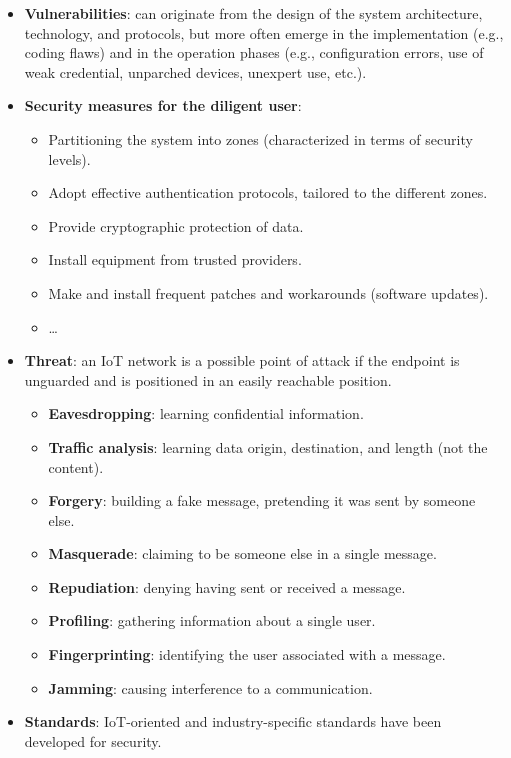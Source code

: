 \begin{itemize}
    \item \textbf{Vulnerabilities}: can originate from the design of the system architecture, technology, and protocols, but more often emerge in the implementation (e.g., coding flaws) and in the operation phases (e.g., configuration errors, use of weak credential, unparched devices, unexpert use, etc.).
    
    \item \textbf{Security measures for the diligent user}:
    \begin{itemize}
        \item Partitioning the system into zones (characterized in terms of security levels).
        \item Adopt effective authentication protocols, tailored to the different zones.
        \item Provide cryptographic protection of data.
        \item Install equipment from trusted providers.
        \item Make and install frequent patches and workarounds (software updates).
        \item \ldots
    \end{itemize}
    
    \item \textbf{Threat}: an IoT network is a possible point of attack if the endpoint is unguarded and is positioned in an easily reachable position.
    \begin{itemize}
        \item \textbf{Eavesdropping}: learning confidential information.
        \item \textbf{Traffic analysis}: learning data origin, destination, and length (not the content).
        \item \textbf{Forgery}: building a fake message, pretending it was sent by someone else.
        \item \textbf{Masquerade}: claiming to be someone else in a single message.
        \item \textbf{Repudiation}: denying having sent or received a message.
        \item \textbf{Profiling}: gathering information about a single user.
        \item \textbf{Fingerprinting}: identifying the user associated with a message.
        \item \textbf{Jamming}: causing interference to a communication.
    \end{itemize}
    
    \item \textbf{Standards}: IoT-oriented and industry-specific standards have been developed for security.
\end{itemize}

